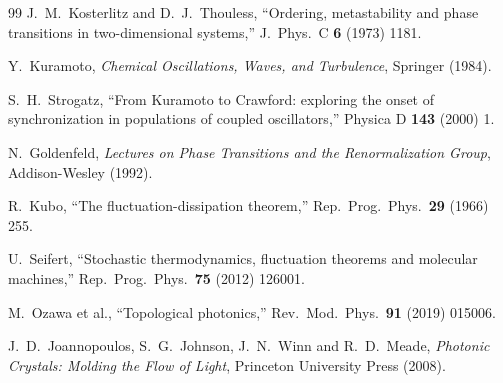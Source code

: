 \documentclass[12pt]{article}
\begin{document}
\begin{thebibliography}{99}
J.~M.~Kosterlitz and D.~J.~Thouless,
``Ordering, metastability and phase transitions in two-dimensional systems,''
J.\ Phys.\ C {\bf 6} (1973) 1181.

Y.~Kuramoto,
\textit{Chemical Oscillations, Waves, and Turbulence},
Springer (1984).

S.~H.~Strogatz,
``From Kuramoto to Crawford: exploring the onset of synchronization in populations of coupled oscillators,''
Physica D {\bf 143} (2000) 1.

N.~Goldenfeld,
\textit{Lectures on Phase Transitions and the Renormalization Group},
Addison-Wesley (1992).

R.~Kubo,
``The fluctuation-dissipation theorem,''
Rep.\ Prog.\ Phys.\ {\bf 29} (1966) 255.

U.~Seifert,
``Stochastic thermodynamics, fluctuation theorems and molecular machines,''
Rep.\ Prog.\ Phys.\ {\bf 75} (2012) 126001.

M.~Ozawa et al.,
``Topological photonics,''
Rev.\ Mod.\ Phys.\ {\bf 91} (2019) 015006.

J.~D.~Joannopoulos, S.~G.~Johnson, J.~N.~Winn and R.~D.~Meade,
\textit{Photonic Crystals: Molding the Flow of Light},
Princeton University Press (2008).

\end{thebibliography}
\end{document}
